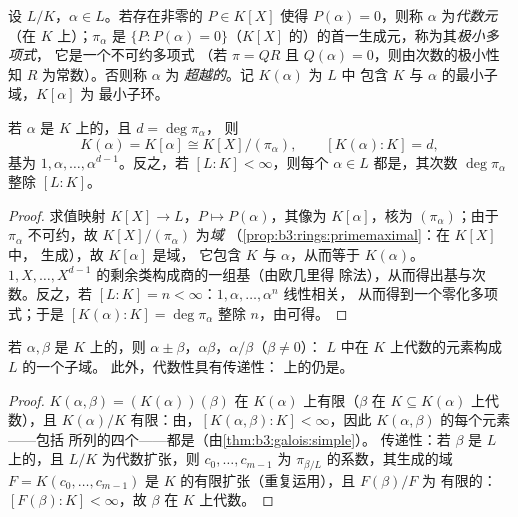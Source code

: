 \begin{definition}\label{def:b3:galois:algebraic}
设 $L/K$，$\alpha \in L$。若存在非零的 $P \in K[X]$ 使得
$P(\alpha) = 0$，则称 $\alpha$ 为\emph{代数元}
（在 $K$ 上）；$\pi_\alpha$ 是
$\{P : P(\alpha) = 0\}$（$K[X]$ 的）的首一生成元，称为其\emph{极小多项式}，
它是一个不可约多项式
（若 $\pi = QR$ 且 $Q(\alpha) = 0$，则由次数的极小性知 $R$
为常数）。否则称 $\alpha$ 为
\emph{超越的}。记 $K(\alpha)$ 为 $L$ 中
包含 $K$ 与 $\alpha$ 的最小子域，$K[\alpha]$ 为
最小子环。
\end{definition}

\begin{theorem}\label{thm:b3:galois:simple}
若 $\alpha$ 是 $K$ 上的，且 $d = \deg\pi_\alpha$，
则
\[
K(\alpha) = K[\alpha] \cong K[X]/(\pi_\alpha),
\qquad [K(\alpha) : K] = d,
\]
基为 $1, \alpha, \dots, \alpha^{d-1}$。反之，若
$[L:K] < \infty$，则每个 $\alpha \in L$ 都是，其次数
$\deg \pi_\alpha$ 整除 $[L:K]$。
\end{theorem}

\begin{proof}
求值映射 $K[X] \to L$，$P \mapsto P(\alpha)$，其像为
$K[\alpha]$，核为 $(\pi_\alpha)$；由于 $\pi_\alpha$
不可约，故 $K[X]/(\pi_\alpha)$ 为\emph{域}
（\cref{prop:b3:rings:primemaximal}：在 $K[X]$ 中，
生成），故 $K[\alpha]$ 是域，
它包含 $K$ 与 $\alpha$，从而等于 $K(\alpha)$。
$1, X, \dots, X^{d-1}$ 的剩余类构成商的一组基（由欧几里得
除法），从而得出基与次数。反之，若 $[L:K]
= n < \infty$：$1, \alpha, \dots, \alpha^n$ 线性相关，
从而得到一个零化多项式；于是 $[K(\alpha):K] =
\deg\pi_\alpha$ 整除 $n$，由可得。
\end{proof}

\begin{corollary}\label{cor:b3:galois:algclosed}
若 $\alpha, \beta$ 是 $K$ 上的，则 $\alpha \pm
\beta$，$\alpha\beta$，$\alpha/\beta$（$\beta \ne 0$）：
$L$ 中在 $K$ 上代数的元素构成 $L$ 的一个子域。
此外，代数性具有传递性：
上的仍是。
\end{corollary}

\begin{proof}
$K(\alpha, \beta) = (K(\alpha))(\beta)$ 在
$K(\alpha)$ 上有限（$\beta$ 在 $K \subseteq K(\alpha)$ 上代数），且
$K(\alpha)/K$ 有限：由，$[K(\alpha,\beta):K] <
\infty$，因此 $K(\alpha, \beta)$ 的每个元素——包括
所列的四个——都是（由\cref{thm:b3:galois:simple}）。
传递性：若 $\beta$ 是 $L$ 上的，且 $L/K$
为代数扩张，则 $c_0, \dots, c_{m-1}$ 为
$\pi_{\beta/L}$ 的系数，其生成的域 $F = K(c_0, \dots,
c_{m-1})$ 是 $K$ 的有限扩张（重复运用），且 $F(\beta)/F$ 为
有限的：$[F(\beta):K] < \infty$，故 $\beta$ 在
$K$ 上代数。
\end{proof}

